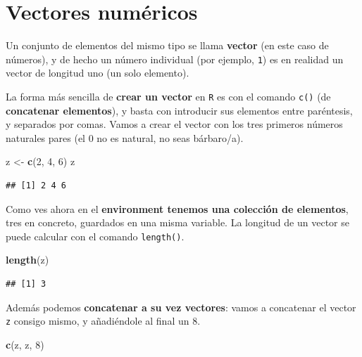 \documentclass[11pt,]{book}
\newenvironment{Shaded}{\begin{snugshade}}{\end{snugshade}}
\newcommand{\DecValTok}[1]{\textcolor[rgb]{0.06,0.06,0.06}{#1}}
\newcommand{\KeywordTok}[1]{\textcolor[rgb]{0.27,0.27,0.27}{\textbf{#1}}}
\newcommand{\NormalTok}[1]{#1}
\newcommand{\StringTok}[1]{\textcolor[rgb]{0.5,0.5,0.5}{#1}}
\begin{document}
\hypertarget{vectores-numuxe9ricos}{%
\section{Vectores numéricos}\label{vectores-numuxe9ricos}}

Un conjunto de elementos del mismo tipo se llama \textbf{vector} (en este caso de números), y de hecho un número individual (por ejemplo, \texttt{1}) es en realidad un vector de longitud uno (un solo elemento).

La forma más sencilla de \textbf{crear un vector} en \texttt{R} es con el comando \texttt{c()} (de \textbf{concatenar elementos}), y basta con introducir sus elementos entre paréntesis, y separados por comas. Vamos a crear el vector con los tres primeros números naturales pares (el 0 no es natural, no seas bárbaro/a).

\begin{Shaded}
\begin{Highlighting}[]
\NormalTok{z <-}\StringTok{ }\KeywordTok{c}\NormalTok{(}\DecValTok{2}\NormalTok{, }\DecValTok{4}\NormalTok{, }\DecValTok{6}\NormalTok{)}
\NormalTok{z}
\end{Highlighting}
\end{Shaded}

\begin{verbatim}
## [1] 2 4 6
\end{verbatim}

Como ves ahora en el \textbf{environment tenemos una colección de elementos}, tres en concreto, guardados en una misma variable. La longitud de un vector se puede calcular con el comando \texttt{length()}.

\begin{Shaded}
\begin{Highlighting}[]
\KeywordTok{length}\NormalTok{(z)}
\end{Highlighting}
\end{Shaded}

\begin{verbatim}
## [1] 3
\end{verbatim}

Además podemos \textbf{concatenar a su vez vectores}: vamos a concatenar el vector \texttt{z} consigo mismo, y añadiéndole al final un 8.

\begin{Shaded}
\begin{Highlighting}[]
\KeywordTok{c}\NormalTok{(z, z, }\DecValTok{8}\NormalTok{)}
\end{Highlighting}
\end{Shaded}
\end{document}
